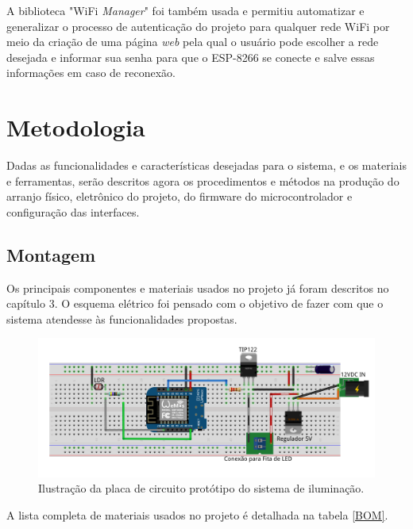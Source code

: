 A biblioteca "WiFi \textit{Manager}" \cite{wifimng} foi também usada e permitiu automatizar e generalizar o processo de autenticação do projeto para qualquer rede WiFi por meio da criação de uma página \textit{web} pela qual o usuário pode escolher a rede desejada e informar sua senha para que o ESP-8266 se conecte e salve essas informações em caso de reconexão.

\section{Metodologia}

Dadas as funcionalidades e características desejadas para o sistema, e os materiais e ferramentas, serão descritos agora os procedimentos e métodos na produção do arranjo físico, eletrônico do projeto, do firmware do microcontrolador e configuração das interfaces.

\subsection{Montagem}

Os principais componentes e materiais usados no projeto já foram descritos no capítulo 3. O esquema elétrico foi pensado com o objetivo de fazer com que o sistema atendesse às funcionalidades propostas.

\begin{figure}[ht]
    \begin{center}
    \includegraphics[width=\textwidth]{figuras/fritzproto.PNG}
    \end{center}
    \caption[Ilustração da placa de circuito protótipo do sistema de iluminação.]{Ilustração da placa de circuito protótipo do sistema de iluminação.}
    \label{fproto}
\end{figure}

A lista completa de materiais usados no projeto é detalhada na tabela \ref{BOM}.

